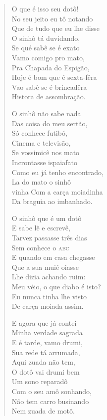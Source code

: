 \begin{verse}
O que é isso seu dotô!\\
No seu jeito eu tô notando\\
Que de tudo que eu lhe disse\\
O sinhô tá duvidando,\\
Se qué sabê se é exato\\
Vamo comigo pro mato,\\
Pra Chapada do Espigão,\\
Hoje é bom que é sexta-fêra\\
Vao sabê se é brincadêra\\
Histora de assombração.

O sinhô não sabe nada\\
Das coisa do meu sertão,\\
Só conhece futibó,\\
Cinema e televisão,\\
Se vossimicê nos mato\\
Incrontasse ispaiafato\\
Como eu já tenho encontrado,\\
La do mato o sinhô\\
vinha Com a carça moiadinha\\
Da braguia ao imbanhado.

O sinhô que é um dotô\\
E sabe lê e escrevê,\\
Tarvez passasse três dias\\
Sem conhece o \textsc{abc}\\
E quando em casa chegasse\\
Que a sua muié oiasse\\
Lhe dizia achando ruim:\\
Meu véio, o que diabo é isto?\\
Eu nunca tinha lhe visto\\
De carça moiada assim.

E agora que já contei\\
Minha verdade sagrada\\
E é tarde, vamo drumi,\\
Sua rede tá arrumada,\\
Aqui zuada não tem,\\
O dotô vai drumi bem\\
Um sono reparadô\\
Com o seu amô sonhando,\\
Não tem carro businando\\
Nem zuada de motô.


\end{verse}
